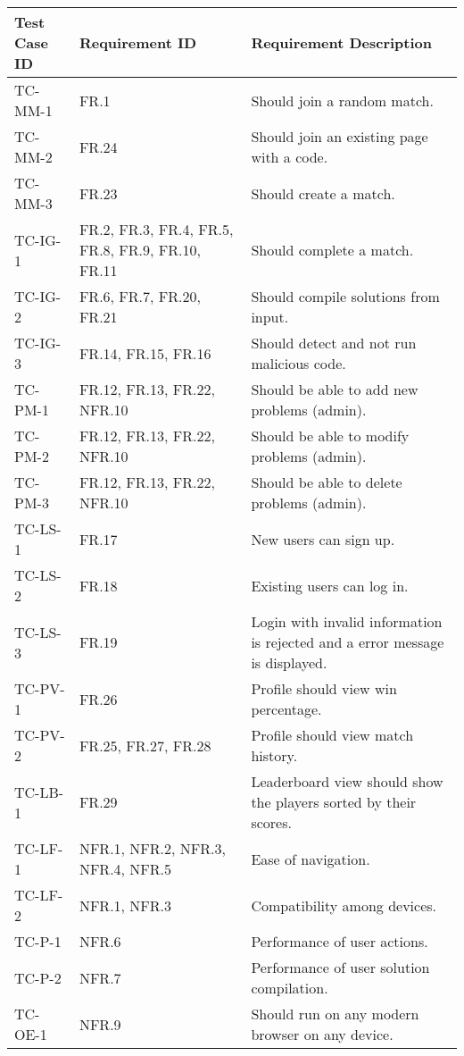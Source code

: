 \documentclass[12pt, titlepage]{article}
\begin{document}
\begin{longtable}{| p{2.5cm} | p{3cm} | p{8cm}| }
    \hline
    Test Case ID & Requirement ID & Requirement Description\\
    \hline
    TC-MM-1 & FR.1 & Should join a random match.\\
    \hline
    TC-MM-2 & FR.24 & Should join an existing page with a code. \\
     \hline
    TC-MM-3 & FR.23 & Should create a match. \\
     \hline
    TC-IG-1 & FR.2, FR.3, FR.4, FR.5, FR.8, FR.9, FR.10, FR.11 & Should complete a match. \\
     \hline
    TC-IG-2 & FR.6, FR.7, FR.20, FR.21 & Should compile solutions from input.\\
     \hline
    TC-IG-3 & FR.14, FR.15, FR.16   & Should detect and not run malicious code.\\
     \hline
    TC-PM-1 & FR.12, FR.13, FR.22, NFR.10 & Should be able to add new problems (admin).\\
     \hline
    TC-PM-2 & FR.12, FR.13, FR.22, NFR.10 & Should be able to modify problems (admin).\\
     \hline
    TC-PM-3 & FR.12, FR.13, FR.22, NFR.10 & Should be able to delete problems (admin).\\
     \hline
    TC-LS-1 & FR.17 & New users can sign up. \\
     \hline
    TC-LS-2 & FR.18  & Existing users can log in. \\
     \hline
    TC-LS-3 & FR.19  & Login with invalid information is rejected and a error message is displayed. \\
     \hline
    TC-PV-1 & FR.26 & Profile should view win percentage.\\
     \hline
    TC-PV-2 & FR.25, FR.27, FR.28  & Profile should view match history.\\
     \hline
    TC-LB-1 & FR.29 & Leaderboard view should show the players sorted by their scores.\\
     \hline
    TC-LF-1 & NFR.1, NFR.2, NFR.3, NFR.4, NFR.5 & Ease of navigation.\\
    \hline
    TC-LF-2 & NFR.1, NFR.3  & Compatibility among devices.\\
    \hline
     TC-P-1 & NFR.6 & Performance of user actions.\\
    \hline
    TC-P-2 & NFR.7 & Performance of user solution compilation.\\
     \hline
    TC-OE-1 & NFR.9 & Should run on any modern browser on any device. \\

\end{longtable}
\end{document}
